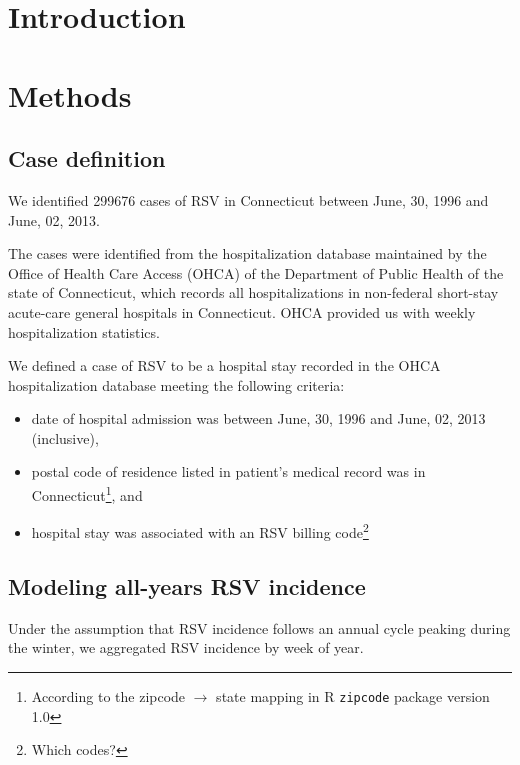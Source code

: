 \documentclass{article}\usepackage[]{graphicx}\usepackage[]{color}
\begin{document}
\begin{abstract}
    
\end{abstract}    

\begin{multicols}{2}

\section{Introduction}

\section{Methods}

\subsection{Case definition}

We identified 299676 cases of RSV in Connecticut between June, 30, 1996 and June, 02, 2013.

The cases were identified from the hospitalization database maintained by the Office of Health Care Access (OHCA) of the Department of Public Health of the state of Connecticut, which records all hospitalizations in non-federal short-stay acute-care general hospitals in Connecticut. OHCA provided us with weekly hospitalization statistics. 

We defined a case of RSV to be a hospital stay recorded in the OHCA hospitalization database meeting the following criteria:

\begin{itemize}
    \item date of hospital admission was between June, 30, 1996 and June, 02, 2013 (inclusive),
    \item postal code of residence listed in patient's medical record was in Connecticut\footnote{According to the zipcode $\rightarrow$ state mapping in R \texttt{zipcode} package version 1.0}, and
    \item hospital stay was associated with an RSV billing code\footnote{Which codes?}
\end{itemize}

\subsection{Modeling all-years RSV incidence}

Under the assumption that RSV incidence follows an annual cycle peaking during the winter, we aggregated RSV incidence by week of year.


\end{multicols}
\end{document}
